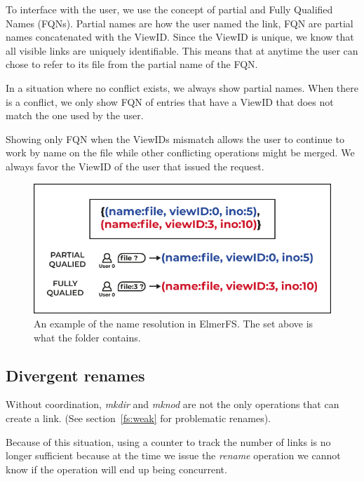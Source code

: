 \documentclass[sigconf,anonymous,10pt]{acmart}
\begin{document}
To interface with the user, we use the concept of partial and
Fully Qualified Names (FQNs).
Partial names are how the user named the link,
FQN are partial names concatenated with the ViewID.
Since the ViewID is unique, we know that all visible links are uniquely
identifiable. This means that at anytime the user can chose to refer to its file
from the partial name of the FQN.

In a situation where no conflict exists, we always show partial names.
When there is a conflict, we only show FQN of entries that have a ViewID that
does not match the one used by the user.

Showing only FQN when the ViewIDs mismatch allows the user to continue to
work by name on the file while other conflicting operations might be merged.
We always favor the ViewID of the user that issued the request.


\begin{figure}[h]
	\caption{An example of the name resolution in ElmerFS. The set above is
	what the folder contains.}
	\label{fig:fqn}
	\centering
	\includegraphics[scale=0.6]{Le-bonhomme-sait-pas-ce-quil-veut.pdf}
\end{figure}


\subsection{Divergent renames}

Without coordination, \textit{mkdir} and \textit{mknod} are not the only
operations that can create a link. (See section~\ref{fs:weak} for problematic
renames).

Because of this situation, using a counter to track the number of links is no
longer sufficient because at the time we issue the \textit{rename} operation
we cannot know if the operation will end up being concurrent.
\end{document}
